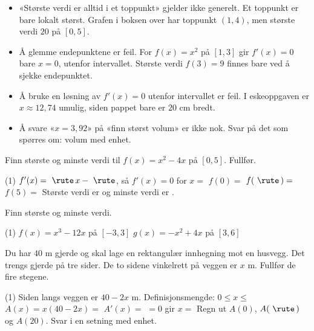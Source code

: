 \begin{vanligfeil}
\begin{itemize}[leftmargin=1.2em,itemsep=1pt,topsep=0pt]
  \item «Største verdi er alltid i et toppunkt» gjelder ikke generelt. Et toppunkt er bare lokalt størst. Grafen i boksen over har toppunkt $(1, 4)$, men største verdi $20$ på $[0, 5]$.
  \item Å glemme endepunktene er feil. For $f(x) = x^2$ på $[1, 3]$ gir $f'(x) = 0$ bare $x = 0$, utenfor intervallet. Største verdi $f(3) = 9$ finnes bare ved å sjekke endepunktet.
  \item Å bruke en løsning av $f'(x) = 0$ utenfor intervallet er feil. I eskeoppgaven er $x \approx 12,74$ umulig, siden pappet bare er $20$ cm bredt.
  \item Å svare «$x = 3,92$» på «finn størst volum» er ikke nok. Svar på det som spørres om: volum med enhet.
\end{itemize}
\end{vanligfeil}


Finn største og minste verdi til $f(x) = x^2 - 4x$ på $[0, 5]$. Fullfør.
\begin{tasks}(1)
  \task $f'(x) = \ \rute\, x - \ \rute$, så $f'(x) = 0$ for $x = $ \skrivlinje[2cm]
  \task $f(0) = $ \skrivlinje[1.5cm] \quad $f(\ \rute\,) = $ \skrivlinje[1.5cm] \quad $f(5) = $ \skrivlinje[1.5cm]
  \task Største verdi er \skrivlinje[1.5cm] og minste verdi er \skrivlinje[1.5cm].
\end{tasks}

Finn største og minste verdi.
\begin{tasks}(1)
  \task $f(x) = x^3 - 12x$ på $[-3, 3]$
  \task $g(x) = -x^2 + 4x$ på $[3, 6]$
\end{tasks}

Du har $40$ m gjerde og skal lage en rektangulær innhegning mot en husvegg. Det trengs gjerde på tre sider. De to sidene vinkelrett på veggen er $x$ m. Fullfør de fire stegene.
\begin{tasks}(1)
  \task Siden langs veggen er $40 - 2x$ m. Definisjonsmengde: $0 \le x \le$ \skrivlinje[1.5cm]
  \task $A(x) = x(40 - 2x) = $ \skrivlinje[4cm]
  \task $A'(x) = $ \skrivlinje[3cm] $= 0$ gir $x = $ \skrivlinje[1.5cm]
  \task Regn ut $A(0)$, $A(\ \rute\,)$ og $A(20)$. Svar i en setning med enhet.
\end{tasks}


